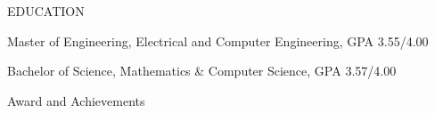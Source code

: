 \documentclass[a4paper,10pt]{extarticle}
\begin{document}
\begin{customsection}{EDUCATION}

    {Master of Engineering, Electrical and Computer Engineering, GPA 3.55/4.00}

    {Bachelor of Science, Mathematics \& Computer Science, GPA 3.57/4.00}

\end{customsection}
 
\begin{customsection}{Award and Achievements}


\end{customsection}

\end{document}
